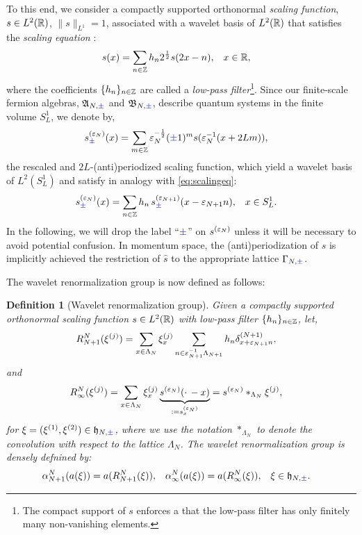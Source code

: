 \documentclass[a4paper, 11pt]{article}
\newcommand{\fA}{\mathfrak{A}}\newcommand{\cA}{\mathcal{A}}\newcommand{\dA}{\mathds{A}}\newcommand{\sA}{\mathscr{A}}
\newcommand{\fB}{\mathfrak{B}}\newcommand{\cB}{\mathcal{B}}\newcommand{\dB}{\mathds{B}}\newcommand{\sB}{\mathscr{B}}
\newcommand{\fh}{\mathfrak{h}}
\DeclareMathOperator{\1}{\mathds{1}}
\newtheorem{defn}[thm]{Definition}
\begin{document}
To this end, we consider a compactly supported orthonormal \textit{scaling function}, $s\in L^{2}(\mathbb{R})$, $\|s\|_{L^{1}}=1$, associated with a wavelet basis of $L^{2}(\mathbb{R})$ that satisfies the \textit{scaling equation} \cite{DaubechiesTenLecturesOn, MeyerWaveletsAndOperators}:
\begin{align}
\label{eq:scalingeq}
s(x) & = \sum_{n\in\mathbb{Z}}h_{n} 2^{\frac{1}{2}}s(2x-n), & x & \in\mathbb{R},
\end{align}
where the coefficients $\{h_{n}\}_{n\in\mathbb{Z}}$ are called a \textit{low-pass filter}\footnote{The compact support of $s$ enforces a that the low-pass filter has only finitely many non-vanishing elements.}. Since our finite-scale fermion algebras, $\fA_{N,{\color{blue}\pm}}$ and $\fB_{N,{\color{blue}\pm}}$, describe quantum systems in the finite volume $S^{1}_{L}$, we denote by,
\begin{align}
\label{eq:rescaledsf}
s^{(\varepsilon_{N})}_{{\color{blue}\pm}}(x) & = \sum_{m\in\mathbb{Z}}\varepsilon_{N}^{-\frac{1}{2}}({\color{blue}\pm}1)^{m}s(\varepsilon_{N}^{-1}(x+2Lm)),
\end{align}
the rescaled and $2L$-(anti)periodized scaling function, which yield a wavelet basis of $L^{2}(S^{1}_{L})$ and satisfy in analogy with \eqref{eq:scalingeq}:
\begin{align}
\label{eq:scalingeqre}
s^{(\varepsilon_{N})}_{{\color{blue}\pm}}(x) & = \sum_{n\in\mathbb{Z}}h_{n}\, s^{(\varepsilon_{N+1})}_{{\color{blue}\pm}}(x-\varepsilon_{N+1}n), & x & \in S^{1}_{L}.
\end{align}
In the following, we will drop the label ``${\color{blue}\pm}$'' on $s^{(\varepsilon_{N})}$ unless it will be necessary to avoid potential confusion. In momentum space, the (anti)periodization of $s$ is implicitly achieved the restriction of $\hat{s}$ to the appropriate lattice $\Gamma_{N,{\color{blue}\pm}}$.

The wavelet renormalization group is now defined as follows:

\begin{defn}[Wavelet renormalization group]
\label{def:waveletrg}
Given a compactly supported orthonormal scaling function $s\in L^{2}(\mathbb{R})$ with low-pass filter $\{h_{n}\}_{n\in\mathbb{Z}}$, let,
\begin{align}
\label{eq:waveletrg1p}
R^{N}_{N+1}(\xi^{(j)}) & = \sum_{x\in\Lambda_{N}}\xi^{(j)}_{x}\sum_{n\in\varepsilon_{N+1}^{-1}\Lambda_{N+1}}h_{n}\delta^{(N+1)}_{x+\varepsilon_{N+1}n},
\end{align}
and
\begin{align}
\label{eq:waveletrg1pinf}
R^{N}_{\infty}(\xi^{(j)}) & = \sum_{x\in\Lambda_{N}}\xi^{(j)}_{x}\underbrace{s^{(\vep_{N})}(\cdot\!\ -x)}_{:=s^{(\vep_{N})}_{x}} = s^{(\vep_{N})}\ast_{\Lambda_{N}}\xi^{(j)},
\end{align}
for $\xi=(\xi^{(1)},\xi^{(2)})\in\fh_{N,{\color{blue}\pm}}$, where we use the notation $\ast_{\Lambda_{N}}$ to denote the convolution with respect to the lattice $\Lambda_{N}$. The \emph{wavelet renormalization group} is densely defnined by:
\begin{align}
\label{eq:waveletrg}
\alpha^{N}_{N+1}(a(\xi)) & = a(R^{N}_{N+1}(\xi)), & \alpha^{N}_{\infty}(a(\xi)) & = a(R^{N}_{\infty}(\xi)), & \xi & \in\fh_{N,{\color{blue}\pm}}.
\end{align}
\end{defn}
\end{document}
